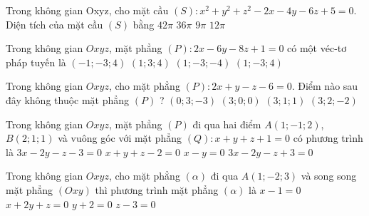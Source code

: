 \begin{ex}%
Trong không gian Oxyz, cho mặt cầu $(S): x^{2}+y^{2}+z^{2}-2 x-4 y-6 z+5=0$. Diện tích của mặt cầu $(S)$ bằng
\choice
{$42 \pi$}
{\True $36 \pi$}
{$9 \pi$}
{$12 \pi$}
\end{ex}

\begin{ex}%
Trong không gian $O x y z$, mặt phẳng $(P): 2 x-6 y-8 z+1=0$ có một véc-tơ pháp tuyến là
\choice
{$(-1 ;-3 ; 4)$}
{$(1 ; 3 ; 4)$}
{\True $(1 ;-3 ;-4)$}
{$(1 ;-3 ; 4)$}
\end{ex}

\begin{ex}%
Trong không gian $Oxyz$, cho mặt phẳng $(P)\colon 2 x+y-z-6=0$. Điểm nào sau đây không thuộc mặt phẳng $(P)$ ?
\choice
{$(0 ; 3 ;-3)$}
{$(3 ; 0 ; 0)$}
{$(3 ; 1 ; 1)$}
{\True $(3 ; 2 ;-2)$}
\end{ex}

\begin{ex}%
Trong không gian $Oxyz$, mặt phẳng $(P)$ đi qua hai điểm $A(1;-1;2)$, $B(2;1;1)$ và vuông góc với mặt phẳng $(Q)\colon x+y+z+1=0$ có phương trình là
\choice
{\True $3x-2y-z-3=0$}
{$x+y+z-2=0$}
{$x-y=0$}
{$3x-2y-z+3=0$}
\end{ex}

\begin{ex}%
Trong không gian $Oxyz$, cho mặt phẳng $(\alpha)$ đi qua $A(1;-2;3)$ và song song mặt phẳng $(Oxy)$ thì phương trình mặt phẳng $(\alpha)$ là
\choice
{$x-1=0$}
{$x+2y+z=0$}
{$y+2=0$}
{\True $z-3=0$}
\end{ex}

